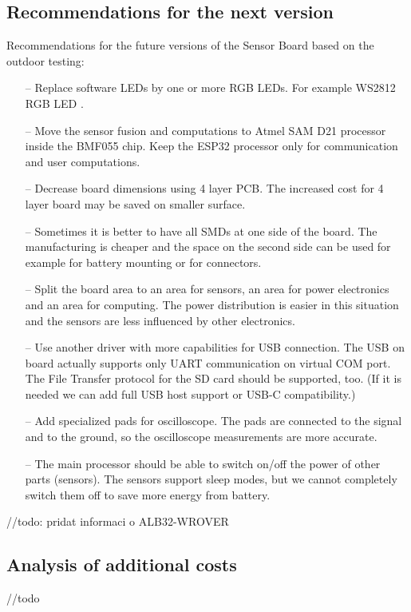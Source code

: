 \subsection{Recommendations for the next version}
\label{recommendationsNextVerison}
Recommendations for the future versions of the Sensor Board based on the outdoor testing:
\begin{itemize}
	\item[--] Replace software LEDs by one or more RGB LEDs. For example WS2812 RGB LED \cite{AdafruitLED}.
	\item[--] Move the sensor fusion and computations to Atmel SAM D21 \cite{AtmelSAM} processor inside the BMF055 \cite{BMF055} chip. Keep the ESP32 \cite{ESP32} processor only for communication and user computations.
	\item[--] Decrease board dimensions using 4 layer PCB. The increased cost for 4 layer board may be saved on smaller surface.
	\item[--] Sometimes it is better to have all SMDs at one side of the board. The manufacturing is cheaper and the space on the second side can be used for example for battery mounting or for connectors.
	\item[--] Split the board area to an area for sensors, an area for power electronics and an area for computing. The power distribution is easier in this situation and the sensors are less influenced by other electronics.
	\item[--] Use another driver with more capabilities for USB connection. The USB on board actually supports only UART communication on virtual COM port. The File Transfer protocol for the SD card should be supported, too. (If it is needed we can add full USB host support or USB-C compatibility.)
	\item[--] Add specialized pads for oscilloscope. The pads are connected to the signal and to the ground, so the oscilloscope measurements are more accurate.
	\item[--] The main processor should be able to switch on/off the power of other parts (sensors). The sensors support sleep modes, but we cannot completely switch them off to save more energy from battery.
\end{itemize}

//todo: pridat informaci o ALB32-WROVER
	
\subsection{Analysis of additional costs}
\label{HWadditionalCosts}
//todo

